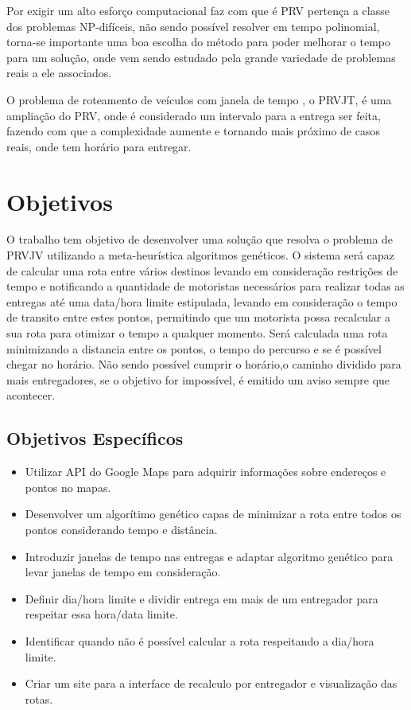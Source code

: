 Por exigir um alto esforço computacional faz com que é PRV pertença a classe dos problemas NP-difíceis, não sendo possível resolver em tempo polinomial, torna-se importante uma boa escolha do método para poder melhorar o tempo para um solução, onde vem sendo estudado pela grande variedade de problemas reais a ele associados.

O problema de roteamento de veículos com janela de tempo , o PRVJT, é uma ampliação do PRV, onde é considerado um intervalo para a entrega ser feita, fazendo com que a complexidade aumente e tornando mais próximo de casos reais, onde tem horário para entregar.

\section{Objetivos}

O trabalho tem objetivo de desenvolver uma solução que resolva o problema de PRVJV utilizando a meta-heurística algoritmos genéticos. 
O sistema será capaz de calcular uma rota entre vários destinos levando em consideração restrições de tempo e notificando a quantidade de motoristas necessários para realizar todas as entregas até uma data/hora limite estipulada, levando em consideração o tempo de transito entre estes pontos, permitindo que um motorista possa recalcular a sua rota para otimizar o tempo a qualquer momento.
Será calculada uma rota minimizando a distancia entre os pontos, o tempo do percurso e se é possível chegar no horário.
Não sendo possível cumprir o horário,o caminho dividido para mais entregadores, se o objetivo for impossível, é emitido um aviso sempre que acontecer.

\subsection{Objetivos Específicos}

\begin{itemize}
	\item Utilizar API do Google Maps para adquirir informações sobre endereços e pontos no mapas.
	\item Desenvolver um algorítimo genético capas de minimizar a rota entre todos os pontos considerando tempo e distância.
	\item Introduzir janelas de tempo nas entregas e adaptar algoritmo genético para levar janelas de tempo em consideração.
	\item Definir dia/hora limite e dividir entrega em mais de um entregador para respeitar essa hora/data limite. 
	\item Identificar quando não é possível calcular a rota respeitando a dia/hora limite.
	\item Criar um site para a interface de recalculo por entregador e visualização das rotas.
\end{itemize}

